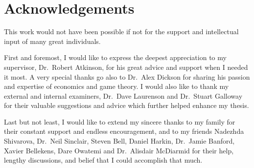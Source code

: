 \chapter*{Acknowledgements} %
\label{cha:acknowledgements}

This work would not have been possible if not for the support and intellectual input of many great individuals.

First and foremost, I would like to express the deepest appreciation to my supervisor, Dr.~Robert Atkinson, for his great advice and support when I needed it most. A very special thanks go also to Dr.~Alex Dickson for sharing his passion and expertise of economics and game theory. I would also like to thank my external and internal examiners, Dr.~Dave Laurenson and Dr.~Stuart Galloway for their valuable suggestions and advice which further helped enhance my thesis.

Last but not least, I would like to extend my sincere thanks to my family for their constant support and endless encouragement, and to my friends Nadezhda Shivarova, Dr.~Neil Sinclair, Steven Bell, Daniel Harkin, Dr.~Jamie Banford, Xavier Bellekens, Dare Owatemi and Dr.~Alisdair McDiarmid for their help, lengthy discussions, and belief that I could accomplish that much.

